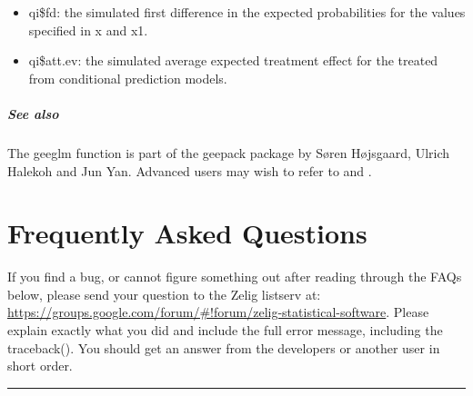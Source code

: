 \documentclass[letterpaper,10pt,english]{sphinxmanual}
\begin{document}
\begin{itemize}
\begin{itemize}
\item {} 
qi\$fd: the simulated first difference in the expected
probabilities for the values specified in x and x1.

\item {} 
qi\$att.ev: the simulated average expected treatment effect for the
treated from conditional prediction models.

\end{itemize}

\end{itemize}


\paragraph{See also}
\label{zelig-poissongee:see-also}
The geeglm function is part of the geepack package by Søren Højsgaard,
Ulrich Halekoh and Jun Yan. Advanced users may wish to refer
to  and .


\chapter{Frequently Asked Questions}
\label{faq:faq}\label{faq::doc}\label{faq:frequently-asked-questions}
If you find a bug, or cannot figure something out after reading through the FAQs below, please send your question to the Zelig listserv at: \href{https://groups.google.com/forum/\#!forum/zelig-statistical-software}{https://groups.google.com/forum/\#!forum/zelig-statistical-software}. Please explain exactly what you did and include the full error message, including the traceback(). You should get an answer from the developers or another user in short order.


\bigskip\hrule{}\bigskip
\end{document}
